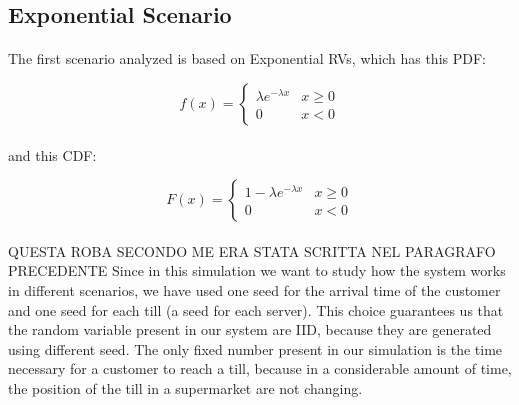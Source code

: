 \subsection{Exponential Scenario}
\paragraph{} The first scenario analyzed is based on Exponential RVs, which has this PDF:
\begin{centering}
\begin{equation}
f(x) = \begin{cases}
 \lambda e^{-\lambda x} &  x\geq 0 \\ 
 0 & x<0 
\end{cases}
\end{equation}
\end{centering}

\paragraph{} and this CDF:

\begin{centering}
\begin{equation}
F(x) = \begin{cases}
 1- \lambda e^{-\lambda x} &  x\geq 0 \\ 
 0 & x<0 
\end{cases}
\end{equation}
\end{centering}
\paragraph{} QUESTA ROBA SECONDO ME ERA STATA SCRITTA NEL PARAGRAFO PRECEDENTE Since in this simulation we want to study how the system works in different scenarios, we have used one seed for the arrival time of the customer and one seed for each till (a seed for each server). This choice guarantees us that the random variable present in our system are IID, because they are generated using different seed.
The only fixed number present in our simulation is the time necessary for a customer to reach a till, because in a considerable amount of time, the position of the till in a supermarket are not changing.

